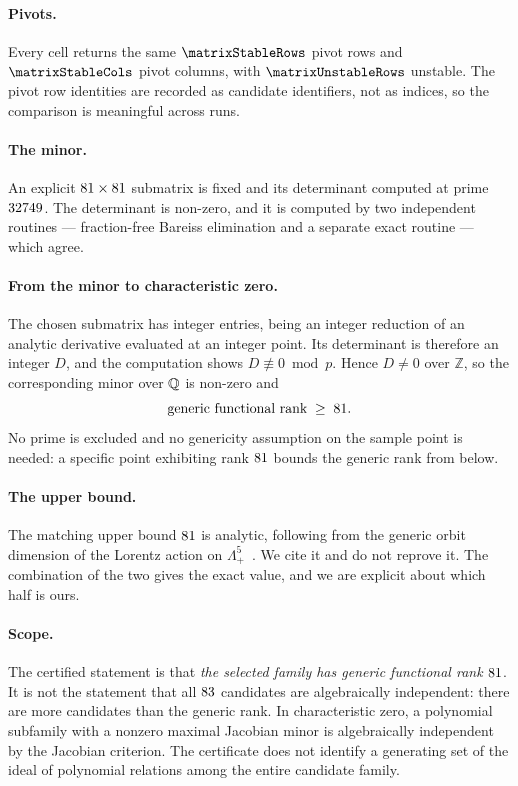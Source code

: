 \paragraph{Pivots.}
Every cell returns the same $\matrixStableRows$ pivot rows and
$\matrixStableCols$ pivot columns, with $\matrixUnstableRows$ unstable. The pivot
row identities are recorded as candidate identifiers, not as indices, so the
comparison is meaningful across runs.

\paragraph{The minor.}
An explicit $81 \times 81$ submatrix is fixed and its determinant
computed at prime $32749$. The determinant is non-zero, and it is computed
by two independent routines --- fraction-free Bareiss elimination and a separate
exact routine --- which agree.

\paragraph{From the minor to characteristic zero.}
The chosen submatrix has integer entries, being an integer reduction of an
analytic derivative evaluated at an integer point. Its determinant is therefore an
integer $D$, and the computation shows $D \not\equiv 0 \bmod p$. Hence
$D \neq 0$ over $\mathbb{Z}$, so the corresponding minor over $\mathbb{Q}$ is non-zero and
\begin{equation}
\text{generic functional rank} \;\ge\; 81 .
\end{equation}
No prime is excluded and no genericity assumption on the sample point is needed:
a specific point exhibiting rank $81$ bounds the generic rank
from below.

\paragraph{The upper bound.}
The matching upper bound $81$ is analytic, following from the
generic orbit dimension of the Lorentz action on
$\Lambda^5_+$~\cite{Hutomo:2025chiral}. We cite it and do not reprove it. The
combination of the two gives the exact value, and we are explicit about which
half is ours.

\paragraph{Scope.}
The certified statement is that \emph{the selected family has generic functional
rank $81$}. It is not the statement that all
$83$ candidates are algebraically independent: there are more candidates than
the generic rank. In characteristic zero, a polynomial subfamily with a
nonzero maximal Jacobian minor is algebraically independent by the Jacobian
criterion. The certificate does not identify a generating set of the ideal
of polynomial relations among the entire candidate family.
